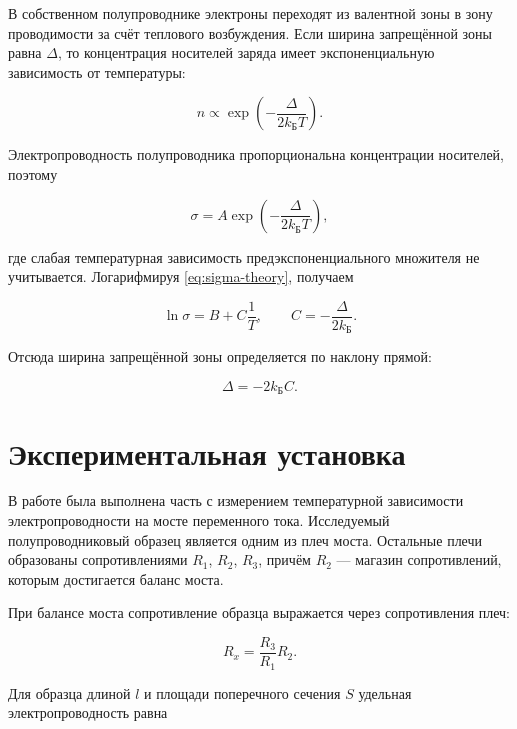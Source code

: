 \documentclass[a4paper,12pt]{article}
\begin{document}
В собственном полупроводнике электроны переходят из валентной зоны в зону проводимости за счёт теплового возбуждения. Если ширина запрещённой зоны равна $\Delta$, то концентрация носителей заряда имеет экспоненциальную зависимость от температуры:

\begin{equation}
    n \propto \exp \left( -\frac{\Delta}{2k_{\text{Б}}T} \right).
\end{equation}

Электропроводность полупроводника пропорциональна концентрации носителей, поэтому

\begin{equation}
    \sigma = A \exp \left( -\frac{\Delta}{2k_{\text{Б}}T} \right),
    \label{eq:sigma-theory}
\end{equation}

где слабая температурная зависимость предэкспоненциального множителя не учитывается. Логарифмируя \eqref{eq:sigma-theory}, получаем

\begin{equation}
    \ln \sigma = B + C \frac{1}{T}, \qquad C = -\frac{\Delta}{2k_{\text{Б}}}.
    \label{eq:linear}
\end{equation}

Отсюда ширина запрещённой зоны определяется по наклону прямой:

\begin{equation}
    \Delta = -2k_{\text{Б}} C.
    \label{eq:delta}
\end{equation}

\section{Экспериментальная установка}

В работе была выполнена часть с измерением температурной зависимости электропроводности на мосте переменного тока. Исследуемый полупроводниковый образец является одним из плеч моста. Остальные плечи образованы сопротивлениями $R_1$, $R_2$, $R_3$, причём $R_2$ --- магазин сопротивлений, которым достигается баланс моста.

При балансе моста сопротивление образца выражается через сопротивления плеч:

\begin{equation}
    R_x = \frac{R_3}{R_1} R_2.
\end{equation}

Для образца длиной $l$ и площади поперечного сечения $S$ удельная электропроводность равна
\end{document}
